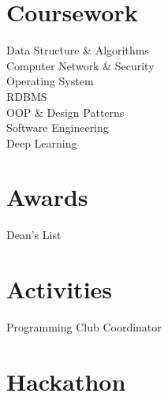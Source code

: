 \documentclass[]{hieudo-build}
\begin{document}
\begin{minipage}[t]{0.65\textwidth}

\end{minipage} 

% 

\newpage

%
%
\begin{minipage}[t]{0.34\textwidth} 

\section{Coursework}
Data Structure \& Algorithms \\
Computer Network \& Security \\
Operating System \\ 
RDBMS \\
OOP \& Design Patterns \\ 
Software Engineering \\ 
Deep Learning \\

\sectionsep


\section{Awards} 
Dean's List\\
\sectionsep

\section{Activities}
Programming Club Coordinator\\
\sectionsep

\section{Hackathon}

\\


\sectionsep




%
%
\end{minipage} 
\end{document}
